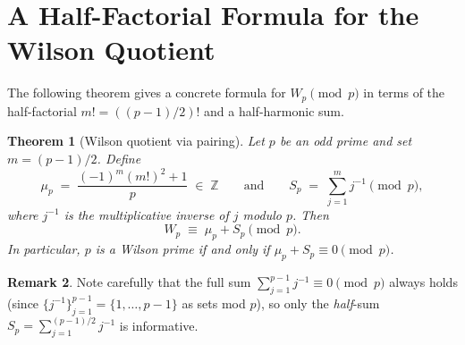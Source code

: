 \documentclass[12pt,a4paper]{amsart}
\newtheorem{theorem}{Theorem}[section]
\theoremstyle{definition}
\newtheorem{remark}[theorem]{Remark}
\newcommand{\Z}{\mathbb{Z}}
\begin{document}
\section{A Half-Factorial Formula for the Wilson Quotient}

The following theorem gives a concrete formula for $W_p \pmod p$ in terms
of the half-factorial $m! = ((p-1)/2)!$ and a half-harmonic sum.

\begin{theorem}[Wilson quotient via pairing]\label{thm:harmonic}
  Let $p$ be an odd prime and set $m = (p-1)/2$.  Define
  \[
    \mu_p \;=\; \frac{(-1)^m (m!)^2 + 1}{p} \;\in\; \Z
    \qquad\text{and}\qquad
    S_p \;=\; \sum_{j=1}^{m} j^{-1} \pmod p,
  \]
  where $j^{-1}$ is the multiplicative inverse of $j$ modulo $p$.  Then
  \[
    W_p \;\equiv\; \mu_p + S_p \pmod p.
  \]
  In particular, $p$ is a Wilson prime if and only if $\mu_p + S_p \equiv 0 \pmod p$.
\end{theorem}

\begin{remark}
  Note carefully that the full sum $\sum_{j=1}^{p-1} j^{-1} \equiv 0 \pmod p$
  always holds (since $\{j^{-1}\}_{j=1}^{p-1} = \{1,\ldots,p-1\}$ as sets mod $p$),
  so only the \emph{half}-sum $S_p = \sum_{j=1}^{(p-1)/2} j^{-1}$ is informative.
\end{remark}
\end{document}
